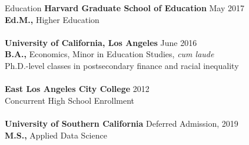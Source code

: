 \documentclass{resume} %
\begin{document}
\begin{rSection}{Education}
{\bf Harvard Graduate School of Education} \hfill May 2017
\\ {\bf Ed.M.,} Higher Education
\\
\\
{\bf University of California, Los Angeles} \hfill June 2016
\\ {\bf B.A.,} Economics, Minor in Education Studies, {\em cum laude}
\\ Ph.D.-level classes in postsecondary finance and racial inequality
\\ 
\\
{\bf East Los Angeles City College} \hfill 2012
\\ Concurrent High School Enrollment
\\
\\
{\bf University of Southern California} \hfill Deferred Admission, 2019
\\ {\bf M.S.,} Applied Data Science
    \end{rSection}
\end{document}
